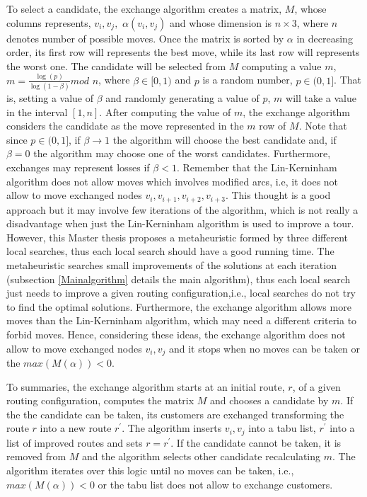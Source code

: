To select a candidate, the exchange algorithm creates a matrix, $M$, whose columns represents, $v_i,v_j,$ $ \alpha(v_i,v_j)$ and whose dimension is $n \times 3$, where $n$ denotes number of possible moves. Once the matrix is sorted by $\alpha$ in decreasing order, its first row will represents the best move, while its last row will represents the worst one. The candidate will be selected from $M$ computing a value $m$, $m=\frac{\log(p)}{\log (1- \beta)}mod$ $n$, where $\beta  \in [0,1)$ and $p$ is a random number, $p \in (0,1]$. That is, setting a value of $\beta$ and randomly generating a value of $p$, $m$ will take a value in the interval $[1,n]$. After computing the value of $m$, the exchange algorithm considers the candidate as the move represented in the $m$ row of $M$. Note that since $p \in (0,1]$, if $\beta \rightarrow 1$ the algorithm will choose the best candidate and, if $\beta = 0$ the algorithm may choose one of the worst candidates. Furthermore, exchanges may represent losses if $\beta < 1$. Remember that the Lin-Kerninham algorithm does not allow moves which involves modified arcs, i.e, it does not allow to move exchanged nodes $v_{i}, v_{i+1},v_{i+2}, v_{i+3}$. This thought is a good approach but it may involve few iterations of the algorithm, which is not really a disadvantage when just the Lin-Kerninham algorithm is used to improve a tour. However, this Master thesis proposes a metaheuristic formed by three different local searches, thus each local search should have a good running time. The metaheuristic searches small improvements of the solutions at each iteration (subsection \ref{Mainalgorithm} details the main algorithm), thus each local search just needs to improve a given routing configuration,i.e., local searches do not try to find the optimal solutions. Furthermore, the exchange algorithm allows more moves than the Lin-Kerninham algorithm, which may need a different criteria to forbid moves. Hence, considering these ideas, the exchange algorithm does not allow to move exchanged nodes $v_i,v_j$ and it stops when no moves can be taken or the $max(M(\alpha))<0$.

To summaries, the exchange algorithm starts at an initial route, $r$, of a given routing configuration, computes the matrix $M$ and chooses a candidate by $m$. If the the candidate can be taken, its customers are exchanged transforming the route $r$ into a new route $r^{'}$. The algorithm inserts $v_i,v_j$ into a tabu list, $r^{'}$ into a list of improved routes and sets $r = r^{'}$. If the candidate cannot be taken, it is removed from $M$ and the algorithm selects other candidate recalculating $m$. The algorithm iterates over this logic until no moves can be taken, i.e., $max(M(\alpha))<0$ or the tabu list does not allow to exchange customers. 

